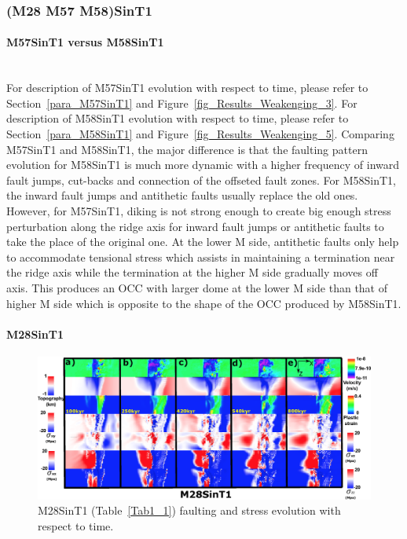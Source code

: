 \subsubsection{(M28 M57 M58)SinT1}

\paragraph{M57SinT1 versus M58SinT1}\label{M57SinT1 versus M58SinT1}

~\\
For description of M57SinT1 evolution with respect to time, please refer to Section~\hyperref[para_M57SinT1]{\ref{para_M57SinT1}} and Figure~\hyperref[fig_Results_Weakenging_3]{\ref{fig_Results_Weakenging_3}}. For description of M58SinT1 evolution with respect to time, please refer to  Section~\hyperref[para_M58SinT1]{\ref{para_M58SinT1}} and Figure~\hyperref[fig_Results_Weakenging_5]{\ref{fig_Results_Weakenging_5}}. Comparing M57SinT1 and M58SinT1, the major difference is that the faulting pattern evolution for M58SinT1 is much more dynamic with a higher frequency of inward fault jumps, cut-backs and connection of the offseted fault zones. For M58SinT1, the inward fault jumps and antithetic faults usually replace the old ones. However, for M57SinT1, diking is not strong enough to create big enough stress perturbation along the ridge axis for inward fault jumps or antithetic faults to take the place of the original one. At the lower M side, antithetic faults only help to accommodate tensional stress which assists in maintaining a termination near the ridge axis while the termination at the higher M side gradually moves off axis. This produces an OCC with larger dome at the lower M side than that of higher M side which is opposite to the shape of the OCC produced by M58SinT1. 

\paragraph{M28SinT1}\label{para_M28SinT1}

\begin{figure}[h]
 \centering
  \includegraphics[width=1.0\textwidth]{./Figures/fig_Results_MRange_1_M28SinT1_time_evolution.eps}
 \caption{M28SinT1 (Table~\hyperref[Tab1_1]{\ref{Tab1_1}}) faulting and stress evolution with respect to time.}
\label{fig_Results_MRange_1}
\end{figure}

